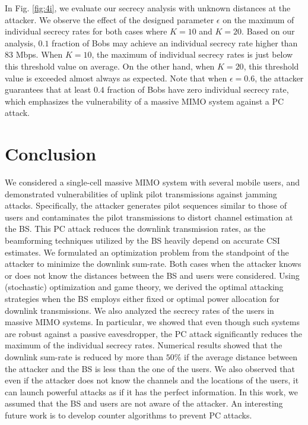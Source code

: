 \documentclass[draftclsnofoot, 12pt, onecolumn, journal]{IEEEtran}
\begin{document}
In Fig. \ref{fig:4i}, we evaluate our secrecy analysis with unknown distances at the attacker.
We observe the effect of the designed parameter $\epsilon$ on the maximum of individual secrecy rates for both cases where $K=10$ and $K=20$.
Based on our analysis, $0.1$ fraction of Bobs may achieve an individual secrecy rate higher than $83$ Mbps.
When $K=10$, the maximum of individual secrecy rates is just below this threshold value on average.
On the other hand, when $K = 20$, this threshold value is exceeded almost always as expected.
Note that when $\epsilon = 0.6$, the attacker guarantees that at least $0.4$ fraction of Bobs have zero individual secrecy rate, which emphasizes the vulnerability of a massive MIMO system against a PC attack. 


\section{Conclusion}
\label{sec:conclusion}

We considered a single-cell massive MIMO system with several mobile users, and demonstrated vulnerabilities of uplink pilot transmissions against jamming attacks.
Specifically, the attacker generates pilot sequences similar to those of users and contaminates the pilot transmissions to distort channel estimation at the BS.
This PC attack reduces the downlink transmission rates, as the beamforming techniques utilized by the BS heavily depend on accurate CSI estimates.
We formulated an optimization problem from the standpoint of the attacker to minimize the downlink sum-rate.
Both cases when the attacker knows or does not know the distances between the BS and users were considered.
Using (stochastic) optimization and game theory, we derived the optimal attacking strategies when the BS employs either fixed or optimal power allocation for downlink transmissions.
We also analyzed the secrecy rates of the users in massive MIMO systems.
In particular, we showed that even though such systems are robust against a passive eavesdropper, the PC attack significantly reduces the maximum of the individual secrecy rates.
Numerical results showed that the downlink sum-rate is reduced by more than $50\%$ if the average distance between the attacker and the BS is less than the one of the users.
We also observed that even if the attacker does not know the channels and the locations of the users, it can launch powerful attacks as if it has the perfect information.
In this work, we assumed that the BS and users are not aware of the attacker.
An interesting future work is to develop counter algorithms to prevent PC attacks.
\end{document}
